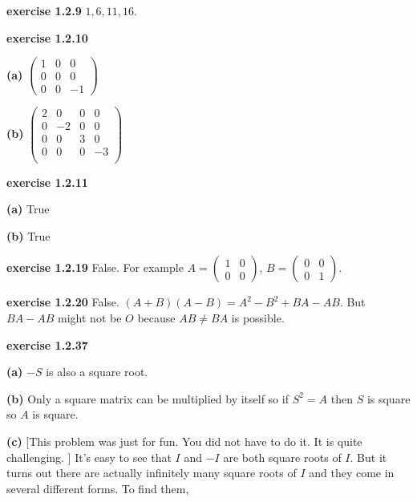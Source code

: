 \documentclass[oneside,12pt]{amsart}
\begin{document}
\smallskip

\textbf{exercise 1.2.9}
$1,6,11,16$.

\smallskip

\textbf{exercise 1.2.10}

\textbf{(a)}
$
\begin{pmatrix}
1 & 0 & 0 \\
0 & 0 & 0 \\
0 & 0 & -1
\end{pmatrix}
$

\smallskip

\textbf{(b)}
$
\begin{pmatrix}
2 & 0 & 0 & 0 \\
0 & -2 & 0 & 0\\
0 & 0 & 3 & 0 \\
0 & 0 & 0 & -3 \\
\end{pmatrix}
$


\smallskip

\textbf{exercise 1.2.11}

\textbf{(a)} True

\smallskip

\textbf{(b)} True

\smallskip

\textbf{exercise 1.2.19}
False. For example
$A=\begin{pmatrix}
1 & 0 \\
0 & 0
\end{pmatrix}$, $B=\begin{pmatrix}
0 & 0 \\
0 & 1
\end{pmatrix}$.


\smallskip

\textbf{exercise 1.2.20} False.
$(A+B)(A-B) = A^2 - B^2 + BA - AB$.
But $BA - AB$ might not be $O$ because
$AB\not=BA$ is possible.

\smallskip

\textbf{exercise 1.2.37}

\textbf{(a)} $-S$ is also a square root.

\smallskip

\textbf{(b)} Only a square matrix can be multiplied by itself so if
$S^2 = A$ then $S$ is square so $A$ is square.

\smallskip

\textbf{(c)} [This problem was just for fun. You did not have to do it.
It is quite challenging. ] It's easy to see that $I$ and $-I$ are both square roots of
$I$. But it turns out there are actually infinitely many square roots of $I$
and they come in several different forms.
To find them,
\end{document}

